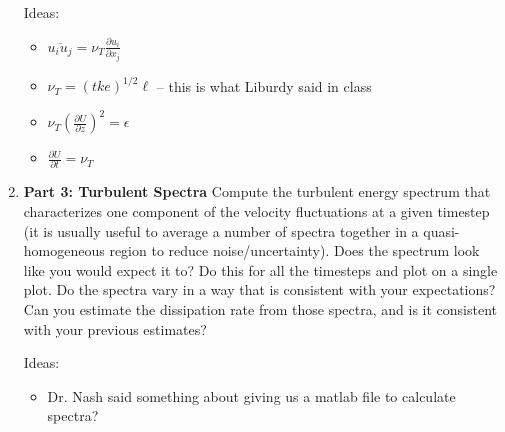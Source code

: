 \documentclass[11pt]{article}
\begin{document}
\begin{enumerate}
    Ideas:
    \begin{itemize}
        \item $\overline{u_i u_j} = \nu_T \frac{\partial u_i}{\partial x_j}$
        \item $\nu_T = \left( tke \right)^{1/2} \ell$ -- this is what Liburdy said in class
        \item $\nu_T \left( \frac{\partial U}{\partial z} \right)^{2} = \epsilon$
        \item $\frac{\partial U}{\partial t} = \nu_T$
    \end{itemize}
    

    \item \textbf{Part 3: Turbulent Spectra} Compute the turbulent energy spectrum that characterizes one component of the velocity fluctuations at a given timestep (it is usually useful to average a number of spectra together in a quasi-homogeneous region to reduce noise/uncertainty). Does the spectrum look like you would expect it to? Do this for all the timesteps and plot on a single plot. Do the spectra vary in a way that is consistent with your expectations? Can you estimate the dissipation rate from those spectra, and is it consistent with your previous estimates?
    
    Ideas:
    \begin{itemize}
        \item Dr. Nash said something about giving us a matlab file to calculate spectra?
    \end{itemize}



\end{enumerate}
\end{document}
